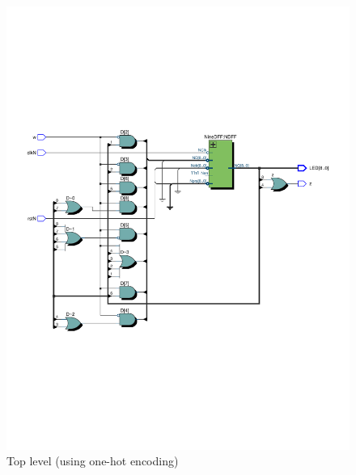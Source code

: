 \documentclass[13pt,a4paper]{report}
\begin{document}
\begin{figure}[H]
\centering
\includegraphics[scale=0.75, clip, trim={0cm 7.5cm 0cm 7.5cm}]{images/Exc1_RTL.pdf}
\caption*{Top level (using one-hot encoding)}
\end{figure}
\end{document}
